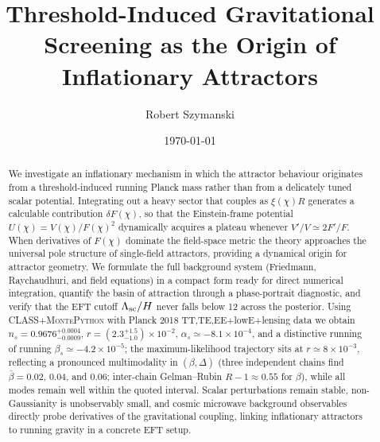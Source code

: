 \documentclass[11pt,a4paper]{article}
\title{Threshold-Induced Gravitational Screening as the Origin of Inflationary Attractors}
\author{Robert Szymanski}
\date{\today}
\begin{document}
\maketitle

\begin{abstract}
We investigate an inflationary mechanism in which the attractor behaviour originates from a threshold-induced running Planck mass rather than from a delicately tuned scalar potential. Integrating out a heavy sector that couples as $\xi(\chi) R$ generates a calculable contribution $\delta F(\chi)$, so that the Einstein-frame potential $U(\chi)=V(\chi)/F(\chi)^2$ dynamically acquires a plateau whenever $V'/V\simeq2F'/F$. When derivatives of $F(\chi)$ dominate the field-space metric the theory approaches the universal pole structure of single-field attractors, providing a dynamical origin for attractor geometry. We formulate the full background system (Friedmann, Raychaudhuri, and field equations) in a compact form ready for direct numerical integration, quantify the basin of attraction through a phase-portrait diagnostic, and verify that the EFT cutoff $\Lambda_{\rm sc}/H$ never falls below 12 across the posterior. Using \textsc{CLASS}+\textsc{MontePython} with Planck 2018 TT,TE,EE+lowE+lensing data we obtain $n_s=0.9676^{+0.0004}_{-0.0009}$, $r=(2.3^{+1.5}_{-1.0})\times10^{-2}$, $\alpha_s\simeq-8.1\times10^{-4}$, and a distinctive running of running $\beta_s\simeq-4.2\times10^{-5}$; the maximum-likelihood trajectory sits at $r\simeq8\times10^{-3}$, reflecting a pronounced multimodality in $(\beta,\Delta)$ (three independent chains find $\bar\beta=0.02$, $0.04$, and $0.06$; inter-chain Gelman--Rubin $R{-}1\approx0.55$ for $\beta$), while all modes remain well within the quoted interval. Scalar perturbations remain stable, non-Gaussianity is unobservably small, and cosmic microwave background observables directly probe derivatives of the gravitational coupling, linking inflationary attractors to running gravity in a concrete EFT setup.
\end{abstract}
\end{document}
